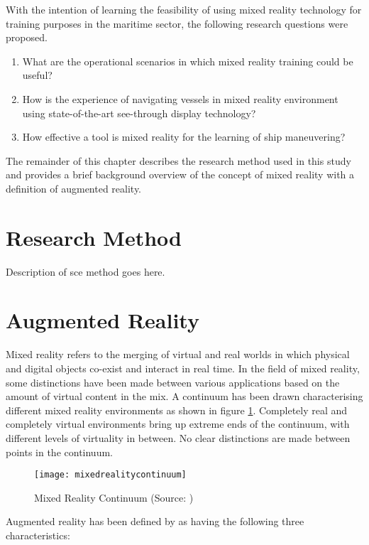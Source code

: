 With the intention of learning the feasibility of using mixed reality technology for training purposes in the maritime sector, the following research questions were proposed. 
\begin{enumerate}
	\item What are the operational scenarios in which mixed reality training could be useful? 
	\item How is the experience of navigating vessels in mixed reality environment using state-of-the-art see-through display technology?
	\item How effective a tool is mixed reality for the learning of ship maneuvering? 
\end{enumerate}

The remainder of this chapter describes the research method used in this study and provides a brief background overview of the concept of mixed reality with a definition of augmented reality.

\section{Research Method}
Description of sce method goes here.

\section{Augmented Reality}
\label{sec:augreal}
Mixed reality refers to the merging of virtual and real worlds in which physical and digital objects co-exist and interact in real time. In the field of mixed reality, some distinctions have been made between various applications based on the amount of virtual content in the mix. A continuum has been drawn characterising different mixed reality environments as shown in figure \ref{fig:mixedrealitycontinuum}. Completely real and completely virtual environments bring up extreme ends of the continuum, with different levels of virtuality in between. No clear distinctions are made between points in the continuum.

\begin{figure}
	\centering
	\texttt{[image: mixedrealitycontinuum]}
	\caption{Mixed Reality Continuum (Source: \cite{milgram1995augmented})}
	\label{fig:mixedrealitycontinuum}
\end{figure}

Augmented reality has been defined by \textcite{azuma1997survey} as having the following three characteristics: 

